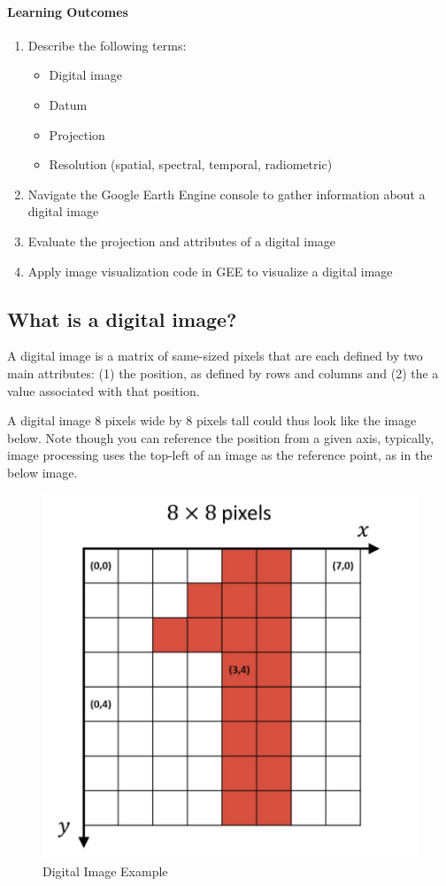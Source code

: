 \documentclass[
]{article}
\providecommand{\tightlist}{%
  \setlength{\itemsep}{0pt}\setlength{\parskip}{0pt}}
\begin{document}
\hypertarget{learning-outcomes-1}{%
\paragraph{Learning Outcomes}\label{learning-outcomes-1}}

\begin{enumerate}
\def\labelenumi{\arabic{enumi}.}
\tightlist
\item
  Describe the following terms:

  \begin{itemize}
  \tightlist
  \item
    Digital image
  \item
    Datum
  \item
    Projection
  \item
    Resolution (spatial, spectral, temporal, radiometric)
  \end{itemize}
\item
  Navigate the Google Earth Engine console to gather information about a digital image
\item
  Evaluate the projection and attributes of a digital image
\item
  Apply image visualization code in GEE to visualize a digital image
\end{enumerate}

\hypertarget{what-is-a-digital-image}{%
\subsection{What is a digital image?}\label{what-is-a-digital-image}}

A digital image is a matrix of same-sized pixels that are each defined by two main attributes: (1) the position, as defined by rows and columns and (2) the a value associated with that position.

A digital image 8 pixels wide by 8 pixels tall could thus look like the image below. Note though you can reference the position from a given axis, typically, image processing uses the top-left of an image as the reference point, as in the below image.

\begin{figure}

{\centering \includegraphics[width=0.5\linewidth]{clip_image003} 

}

\caption{Digital Image Example}\label{fig:digimage}
\end{figure}
\end{document}
